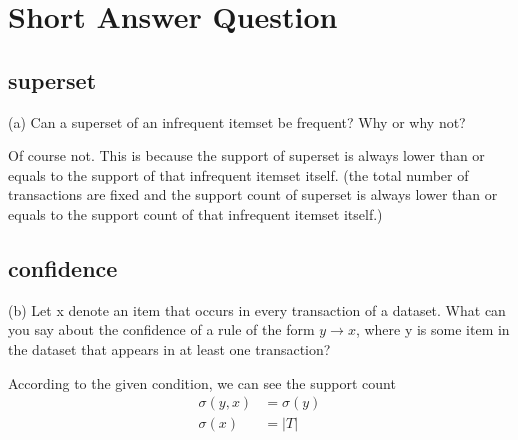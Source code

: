 \documentclass[11pt,a4paper]{article}
\begin{document}
\begin{titlepage}
    \maketitle
\end{titlepage}
\renewcommand{\contentsname}{Contents}
\begin{center} 
    \tableofcontents 
    \listoffigures
\end{center}
\newpage
\section{Short Answer Question}

\subsection{superset}
(a) Can a superset of an infrequent itemset be frequent? Why or why not?

Of course not. This is because the support of superset is always lower than or
equals to the support of that infrequent itemset itself. (the total number of
transactions are fixed and the support count of superset is always lower
than or equals to the support count of that infrequent itemset itself.)

\subsection{confidence}
(b) Let x denote an item that occurs in every transaction of a dataset. What
can you say about the confidence of a rule of the form $y \rightarrow x$, where y is
some item in the dataset that appears in at least one transaction?

According to the given condition, we can see the support count 
\begin{align}
    \sigma(y,x) &= \sigma(y) \\
    \sigma(x) &= |T|
\end{align}
\end{document}

